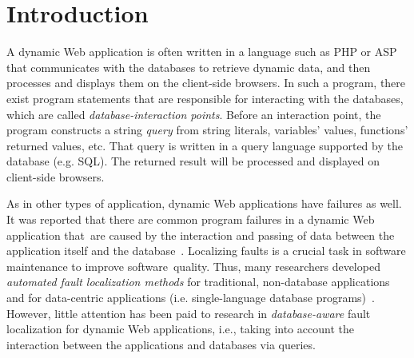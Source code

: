 \section{Introduction}


A dynamic Web application is often written in a language such as PHP
or ASP that communicates with the databases to retrieve dynamic
data, and then processes and displays them on the client-side
browsers.
In such a program, there exist program statements that are responsible
for interacting with the databases, which are called {\em
database-interaction points}. Before an interaction point, the program
constructs a string {\em query} from string literals, variables'
values, functions' returned values, etc. That query is written in a
query language supported by the database (e.g. SQL). The returned
result will be processed and displayed on client-side browsers.


As in other types of application, dynamic Web applications have failures
as well. It was reported that there are common program failures in a
dynamic Web application that~are caused by the interaction and
passing of data between the application itself and the
database~\cite{ga-ase11,brooks-icst09}. Localizing faults is a
crucial task in software maintenance to improve software~quality. 
Thus, many researchers developed {\em automated fault localization
  methods} for traditional, non-database
applications~\cite{abreu-ochiai-07, tarantula05,liblit-pldi05} and for
data-centric applications (i.e. single-language database
programs)~\cite{dor-issta08,litvak10,saha11}. However, little
attention has been paid to research in {\em database-aware} fault
localization for dynamic Web applications, i.e., taking into account
the interaction between the applications and databases via queries.

